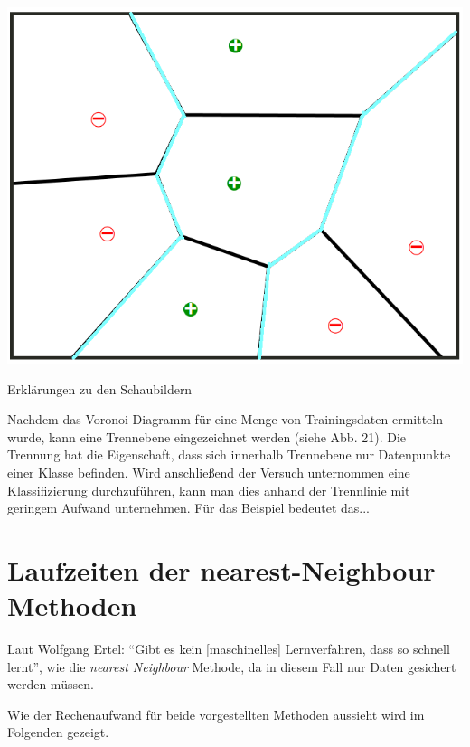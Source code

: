 \documentclass[fontsize=11pt]{scrartcl}
\newenvironment{Figure}
  {\par\medskip\noindent\minipage{\linewidth}}
  {\endminipage\par\medskip}
\begin{document}
            \begin{Figure}
                \centering
                \includegraphics[scale=0.4]{vor3.png}
            \end{Figure}        
            
                        
            Erklärungen zu den Schaubildern\par
            Nachdem das Voronoi-Diagramm für eine Menge von Trainingsdaten ermitteln wurde, kann eine Trennebene eingezeichnet werden (siehe Abb. 21). Die Trennung hat die Eigenschaft, dass sich innerhalb Trennebene nur Datenpunkte einer Klasse befinden. Wird anschließend der Versuch unternommen eine Klassifizierung durchzuführen, kann man dies anhand der Trennlinie mit geringem Aufwand unternehmen. Für das Beispiel bedeutet das...
                         
        \section{Laufzeiten der nearest-Neighbour Methoden}
            Laut Wolfgang Ertel: “Gibt es kein [maschinelles] Lernverfahren, dass so schnell lernt”\cite{ertel2016_p213}, wie die \emph{nearest Neighbour} Methode, da in diesem Fall nur Daten gesichert werden müssen.\par
            Wie der Rechenaufwand für beide vorgestellten Methoden aussieht wird im Folgenden gezeigt.
                        
\end{document}
